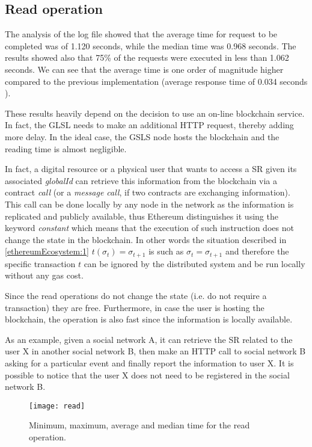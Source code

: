 \subsection{Read operation}

The analysis of the log file showed that the average time for request to be completed was of 1.120 seconds, while the median time was 0.968 seconds. The results showed also that 75\% of the requests were executed in less than 1.062 seconds. We can see that the average time is one order of magnitude higher compared to the previous implementation (average response time of 0.034 seconds \cite{gondor_distributed_2016}). 

These results heavily depend on the decision to use an on-line blockchain service. In fact, the GLSL needs to make an additional HTTP request, thereby adding more delay. In the ideal case, the GSLS node hosts the blockchain and the reading time is almost negligible.

In fact, a digital resource or a physical user that wants to access a SR given its associated \textit{globalId} can retrieve this information from the blockchain via a contract \textit{call} (or a \textit{message call}, if two contracts are exchanging information). This call can be done locally by any node in the network as the information is replicated and publicly available, thus Ethereum distinguishes it using the keyword \textit{constant} which means that the execution of such instruction does not change the state in the blockchain.
In other words the situation described in \ref{ethereumEcosystem:1} $t(\sigma_t) = \sigma_{t+1}$ is such as $\sigma_t = \sigma_{t+1}$ and therefore the specific transaction $t$ can be ignored by the distributed system and be run locally without any gas cost.

Since the read operations do not change the state (i.e. do not require a transaction) they are free. Furthermore, in case the user is hosting the blockchain, the operation is also fast since the information is locally available.

As an example, given a social network A, it can retrieve the SR related to the user X in another social network B, then make an HTTP call to social network B asking for a particular event and finally report the information to user X. It is possible to notice that the user X does not need to be registered in the social network B.

\begin{figure}[h]
	\centering
  \texttt{[image: read]}
	\caption{Minimum, maximum, average and median time for the read operation.}
	\label{fig4}
\end{figure}

